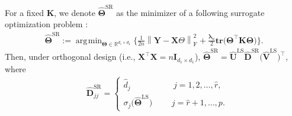 \documentclass[alpha-refs]{wiley-article}
\DeclareMathOperator*{\argmin}{\arg\!\min}
\begin{document}
\begin{proposition} \label{surrogate}
    For a fixed $\boldsymbol{K}$, we denote $\widehat{\boldsymbol{\Theta}}^{\text{SR}}$ as the minimizer of a following surrogate optimization problem : 
    \begin{align} \label{closed_form}
        \widehat{\boldsymbol{\Theta}}^{\text{SR}} := 
        \argmin_{\boldsymbol{\Theta}\in\mathbb{R}^{d_{1} \times d_{2}}} \Bigg\{ \frac{1}{2n} \left\| \boldsymbol{Y}-\boldsymbol{X}\Theta \right\|_{\text{F}}^{2} + \frac{\boldsymbol{\lambda}_{n}}{2} 
        \textbf{tr}\big(\boldsymbol{\Theta}^{\top} \boldsymbol{K} \boldsymbol{\Theta} \big) \Bigg\}.
    \end{align}
    Then, under orthogonal design (i.e., $\boldsymbol{X}^{\top}\boldsymbol{X}=n\boldsymbol{I}_{d_{1} \times d_{1}}$), 
    $\widehat{\boldsymbol{\Theta}}^{\text{SR}} = \widehat{\boldsymbol{U}}^{\text{LS}}\widehat{\boldsymbol{D}}^{\text{SR}}\big(\widehat{\boldsymbol{V}}^{\text{LS}}\big)^{\top}$, where
    \begin{align*}
        &\widehat{\boldsymbol{D}}^{\text{SR}}_{jj} = 
        \begin{cases}
            \widehat{d}_{j} \qquad \qquad \quad \, j = 1,2,\dots,\widehat{r}, \\
            \sigma_{j}\big(\widehat{\boldsymbol{\Theta}}^{\text{LS}} \big)
            \quad \,\,\,\,\,\,\,\, j = \widehat{r}+1,\dots,p. 
        \end{cases}
    \end{align*}
\end{proposition}
\end{document}
